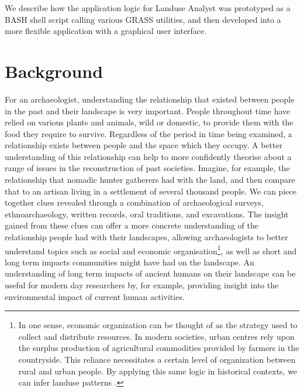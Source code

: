 We describe how the application logic for Landuse Analyst was prototyped as a
BASH shell script calling various GRASS utilities, and then developed into a
more flexible application with a graphical user interface.

\section{Background} \label{sec:Background} For an archaeologist, understanding
the relationship that existed between people in the past and their landscape is
very important.  People throughout time have relied on various plants and
animals, wild or domestic, to provide them with the food they require to
survive.  Regardless of the period in time being examined, a relationship
exists between people and the space which they occupy.  A better understanding
of this relationship can help to more confidently theorise about a range of
issues in the reconstruction of past societies.  Imagine, for example, the
relationship that nomadic hunter gatherers had with the land, and then compare
that to  an artisan living in a settlement of several thousand people.  We can
piece together clues revealed through a combination of archaeological surveys,
ethnoarchaeology, written records, oral traditions, and excavations. The
insight gained from these clues can offer a more concrete understanding of the
relationship people had with their landscapes, allowing archaeologists to
better understand topics such as social and economic organisation\footnote{In
one sense, economic organization can be thought of as the strategy used to
collect and distribute resources.  In modern societies, urban centres rely upon
the surplus production of agricultural commodities provided by farmers in the
countryside.  This reliance necessitates a certain level of organization
between rural and urban people.  By applying this same logic in historical
contexts, we can infer landuse patterns .}, as well as short and long term
impacts communities might have had on the landscape.  An understanding of long
term impacts of ancient humans on their landscape can be useful for modern day
researchers by, for example, providing insight into the environmental impact of
current human activities.

